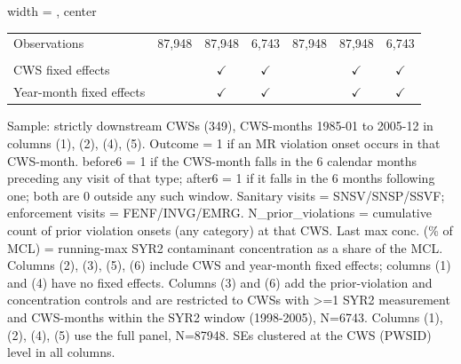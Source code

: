 \begin{table}[htbp]
\begin{adjustbox}{width = \textwidth, center}
\begin{tabular}{lcccccc}
          \\
         
         Observations                          & 87,948         & 87,948        & 6,743         & 87,948         & 87,948        & 6,743\\  
         
          \\
         
         CWS fixed effects                     &                & $\checkmark$  & $\checkmark$  &                & $\checkmark$  & $\checkmark$\\   
         Year-month fixed effects              &                & $\checkmark$  & $\checkmark$  &                & $\checkmark$  & $\checkmark$\\   
         
         \bottomrule
         
      \end{tabular}
      
      
      
   \end{adjustbox}
      {\tiny\linespread{1}\selectfont \par \raggedright 
   Sample: strictly downstream CWSs (349), CWS-months 1985-01 to 2005-12 in columns (1), (2), (4), (5). Outcome = 1 if an MR violation onset occurs in that CWS-month. before6 = 1 if the CWS-month falls in the 6 calendar months preceding any visit of that type; after6 = 1 if it falls in the 6 months following one; both are 0 outside any such window. Sanitary visits = SNSV/SNSP/SSVF; enforcement visits = FENF/INVG/EMRG. N\_prior\_violations = cumulative count of prior violation onsets (any category) at that CWS. Last max conc. (\% of MCL) = running-max SYR2 contaminant concentration as a share of the MCL. Columns (2), (3), (5), (6) include CWS and year-month fixed effects; columns (1) and (4) have no fixed effects. Columns (3) and (6) add the prior-violation and concentration controls and are restricted to CWSs with >=1 SYR2 measurement and CWS-months within the SYR2 window (1998-2005), N=6743. Columns (1), (2), (4), (5) use the full panel, N=87948. SEs clustered at the CWS (PWSID) level in all columns.}
   
\end{table}


